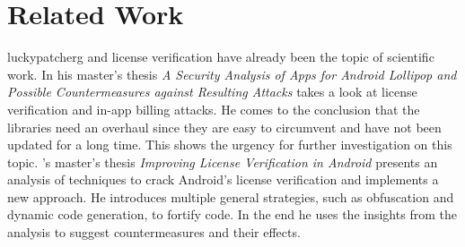 \section{Related Work} \label{subsection:introduction-related}
\gls{luckypatcherg} and license verification have already been the topic of scientific work.
\newline
In his master's thesis \textit{A Security Analysis of Apps for Android Lollipop and Possible Countermeasures against Resulting Attacks} \cite{bernhardSecurity} \citeauthor{bernhardSecurity} takes a look at license verification and in-app billing attacks.
He comes to the conclusion that the libraries need an overhaul since they are easy to circumvent and have not been updated for a long time.
This shows the urgency for further investigation on this topic.
\newline
\citeauthor{munteanLicense}'s master's thesis \textit{Improving License Verification in Android} \cite{munteanLicense} presents an analysis of techniques to crack Android's license verification and implements a new approach.
He introduces multiple general strategies, such as obfuscation and dynamic code generation, to fortify code.
In the end he uses the insights from the analysis to suggest countermeasures and their effects.
